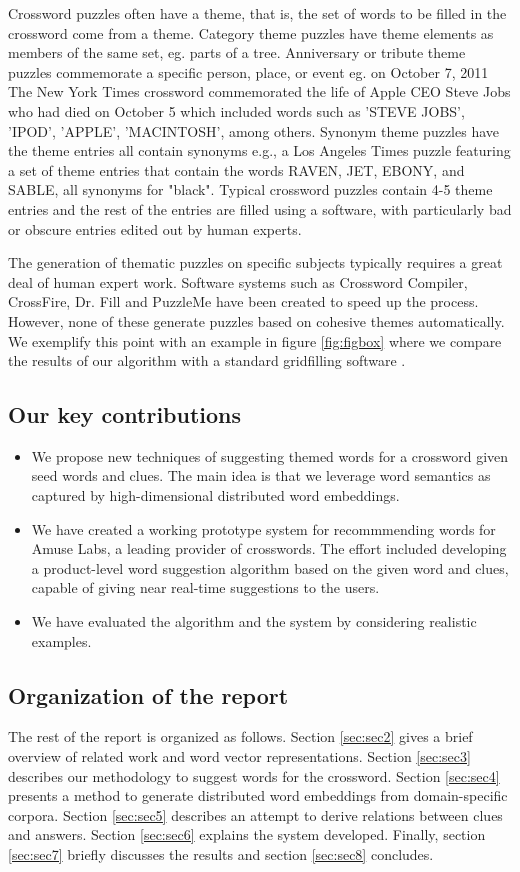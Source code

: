 \documentclass[twoside]{article}
\begin{document}
Crossword puzzles often have a theme, that is, the set of words to be filled in the crossword come from a theme. Category theme puzzles have theme elements as members of the same set, eg. parts of a tree. Anniversary or tribute theme puzzles commemorate a specific person, place, or event eg. on October 7, 2011 The New York Times crossword commemorated the life of Apple CEO Steve Jobs who had died on October 5 which included words such as 'STEVE JOBS', 'IPOD', 'APPLE', 'MACINTOSH', among others. Synonym theme puzzles have the theme entries all contain synonyms e.g., a Los Angeles Times puzzle featuring a set of theme entries that contain the words RAVEN, JET, EBONY, and SABLE, all synonyms for "black". Typical crossword puzzles contain 4-5 theme entries and the rest of the entries are filled using a software, with particularly bad or obscure entries edited out by human experts.

The generation of thematic puzzles on specific subjects typically requires a great deal of human expert work. Software systems such as Crossword Compiler, CrossFire, Dr. Fill \cite{cite6} and PuzzleMe have been created to speed up the process. However, none of these generate puzzles based on cohesive themes automatically. We exemplify this point with an example in figure \ref{fig:figbox} where we compare the results of our algorithm with a standard gridfilling software .

\subsection{Our key contributions}
\begin{itemize}
  \item We propose new techniques of suggesting themed words for a crossword given seed words and clues. The main idea is that we leverage word semantics as captured by high-dimensional distributed word embeddings. 
  \item We have created a working prototype system for recommmending words for Amuse Labs, a leading provider of crosswords. The effort included developing a product-level word suggestion algorithm based on the given word and clues, capable of giving near real-time suggestions to the users.
  \item We have evaluated the algorithm and the system by considering realistic examples.
\end{itemize} 

\subsection{Organization of the report}
The rest of the report is organized as follows. Section \ref{sec:sec2} gives a brief overview of related work and word vector representations. Section \ref{sec:sec3} describes our methodology to suggest words for the crossword. Section \ref{sec:sec4} presents a method to generate distributed word embeddings from domain-specific corpora. Section \ref{sec:sec5} describes an attempt to derive relations between clues and answers. Section \ref{sec:sec6} explains the system developed. Finally, section \ref{sec:sec7} briefly discusses the results and section \ref{sec:sec8} concludes.
\end{document}
